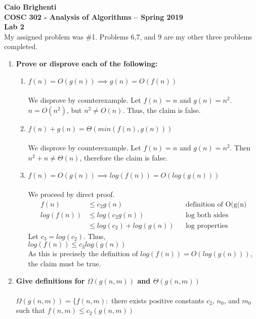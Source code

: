 \documentclass{article}
\begin{document}
\noindent \textbf{Caio Brighenti }\\
\noindent \textbf{COSC 302 - Analysis of Algorithms -- Spring 2019}\\%
\noindent \textbf{Lab 2}\vspace{1em}\\
My assigned problem was \#1. Problems 6,7, and 9 are my other three problems completed.
\begin{enumerate}
	\item \textbf{Prove or disprove each of the following:}
	\begin{enumerate}
		\item $f(n)=O(g(n)) \implies g(n)=O(f(n))$ \\
			\\ We disprove by counterexample. Let $f(n)=n$ and $g(n)=n^2$.  $n=O(n^2)$, but $n^2\neq O(n)$. Thus, the claim is false. \\
		\item $f(n)+g(n)=\Theta (min(f(n),g(n)))$ \\ 
			\\ We disprove by counterexample. Let $f(n)=n$ and $g(n)=n^2$. Then $n^2+n\neq \Theta (n)$, therefore the claim is false. \\
		\item $f(n)=O(g(n))\implies log(f(n))=O(log(g(n)))$ \\
			\\ We proceed by direct proof. 
			\begin{align}
				f(n)&\leq c_2 g(n) && \text{definition of O(g(n)} \\
				log(f(n))&\leq log(c_2 g(n)) && \text{log both sides} \\
				&\leq log(c_2)+log(g(n))&& \text{log properties} 
			\end{align}
			Let $c_3=log(c_2)$. Thus, \\
			$log(f(n))\leq c_3 log(g(n))$ \\
			As this is precisely the definition of $log(f(n))=O(log(g(n)))$, the claim must be true.
	\end{enumerate}
	\setcounter{enumi}{5}
	\item \textbf{Give definitions for $\Omega(g(n,m))$ and $\Theta(g(n,m))$} \\
		\\ $\Omega(g(n,m))=\{ f(n,m): $ there exists positive constants $c_2$, $n_0$, and $m_0$
		\\ such that $f(n,m)\leq c_2(g(n,m))$

\end{enumerate}
\end{document}

